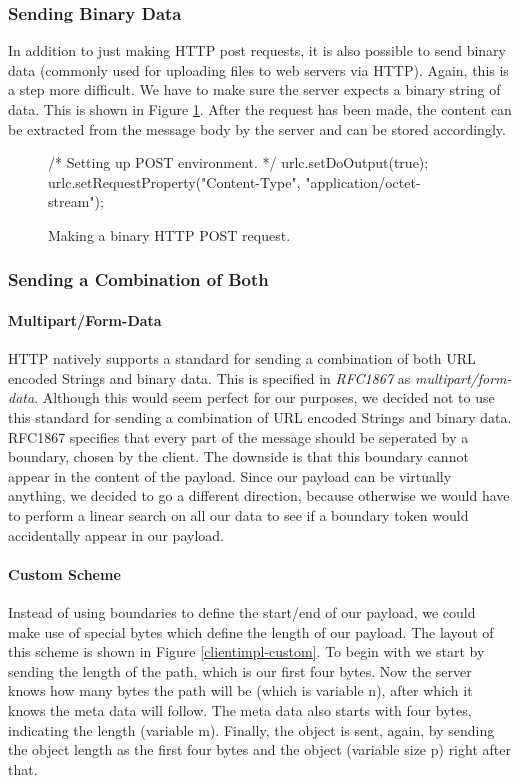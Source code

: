 \subsubsection{Sending Binary Data}
In addition to just making HTTP post requests, it is also possible to send binary
data (commonly used for uploading files to web servers via HTTP). Again, this is
a step more difficult. We have to make sure the server expects a binary string of
data. This is shown in Figure \ref{clientimpl-binpost}. After the request has
been made, the content can be extracted from the message body by the server and
can be stored accordingly.

\begin{figure}[ht] %
\begin{center}
\begin{code}
/* Setting up POST environment. */
urlc.setDoOutput(true);
urlc.setRequestProperty("Content-Type", "application/octet-stream");
\end{code}
\caption{Making a binary HTTP POST request.\label{clientimpl-binpost}}
\end{center}
\end{figure}

\subsubsection{Sending a Combination of Both}
\label{clientimpl-sending-both}

\paragraph{Multipart/Form-Data}
HTTP natively supports a standard for sending a combination of both URL encoded
Strings and binary data. This is specified in \emph{RFC1867} as
\emph{multipart/form-data}. Although this would seem perfect for our purposes, we
decided not to use this standard for sending a combination of URL encoded Strings
and binary data. RFC1867 specifies that every part of the message should be
seperated by a boundary, chosen by the client. The downside is that this boundary
cannot appear in the content of the payload. Since our payload can be virtually
anything, we decided to go a different direction, because otherwise we would have
to perform a linear search on all our data to see if a boundary token would
accidentally appear in our payload.

\paragraph{Custom Scheme}
Instead of using boundaries to define the start/end of our payload, we could make
use of special bytes which define the length of our payload. The layout of this
scheme is shown in Figure \ref{clientimpl-custom}. To begin with we start by
sending the length of the path, which is our first four bytes. Now the server
knows how many bytes the path will be (which is variable n), after which it knows
the meta data will follow. The meta data also starts with four bytes, indicating
the length (variable m). Finally, the object is sent, again, by sending the
object length as the first four bytes and the object (variable size p) right
after that.

